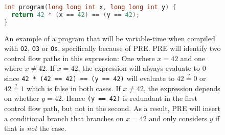 \begin{figure}[H]
  \centering
  \begin{lstlisting}[style=defstyle,language={C},basicstyle=\ttfamily,breaklines=true, xleftmargin=3cm, xrightmargin=3cm]
int program(long long int x, long long int y) { 
  return 42 * (x == 42) == (y == 42); 
}\end{lstlisting} 
    \caption{An example of a program that will be variable-time when compiled with \texttt{O2}, \texttt{O3} or \texttt{Os}, specifically because of PRE.
    PRE will identify two control flow paths in this expression: 
    One where $x=42$ and one where $x \neq 42$.
    If $x=42$, the expression will always evaluate to $0$ since \texttt{42 * (42 == 42) == (y == 42)} will evaluate to $42 \stackrel{?}{=} 0$ or $42 \stackrel{?}{=} 1$ which is false in both cases.
    If $x \neq 42$, the expression depends on whether $y=42$.
    Hence \texttt{(y == 42)} is redundant in the first control flow path, but not in the second.
    As a result, PRE will insert a conditional branch that branches on $x = 42$ and only considers $y$ if that is \textit{not} the case.}
    \label{fig:pre-example}
\end{figure}
